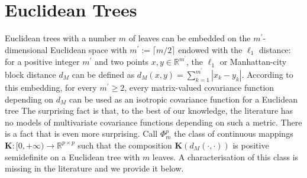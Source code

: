 \documentclass[12pt]{article}
\theoremstyle{plain}
\theoremstyle{remark}
\newcommand{\R}[0]{\mathbb{R}}
\newcommand{\eg}{\textit{e.g. }}
\newcommand{\tobi}[1]{\textcolor{teal}{#1}}
\begin{document}
\section{Euclidean Trees}
\label{sec:linearNetworks}
Euclidean trees with a number $m$ of leaves can be embedded on the $m^\prime$-dimensional Euclidean space {with $m^\prime:=\lceil m/2 \rceil$} %
\citep{anderes_isotropic_2020} endowed with the $\ell_1$ distance: for a positive integer ${m^\prime}$ and two points $x,y \in \R^{{m^\prime}}$, the $\ell_1$ or Manhattan-city block distance $d_{M}$ can be defined as 
$d_{M}(x,y) = \sum_{k=1}^{{m^\prime}} |x_k-y_k|$. According to this embedding, for every ${{m^\prime}} \ge 2$, every matrix-valued covariance function depending on $d_M$ can be used as an isotropic covariance function for a {Euclidean tree} %
The surprising fact is that, to the best of our knowledge, the literature has no models of multivariate covariance functions depending on such a metric. %
There is a fact that is even more surprising. Call $\Phi_{m}^p$ the class of continuous mappings ${\mathbf{K}}: [0,+\infty) \to \mathbb{R}^{p \times p}$ such that the composition ${\mathbf{K}}(d_{M}(\cdot,\cdot))$ is positive {semi}definite on a Euclidean tree with $m$ leaves. A characterisation of this class is {missing in the literature} %
and we provide it below. 

\end{document}
